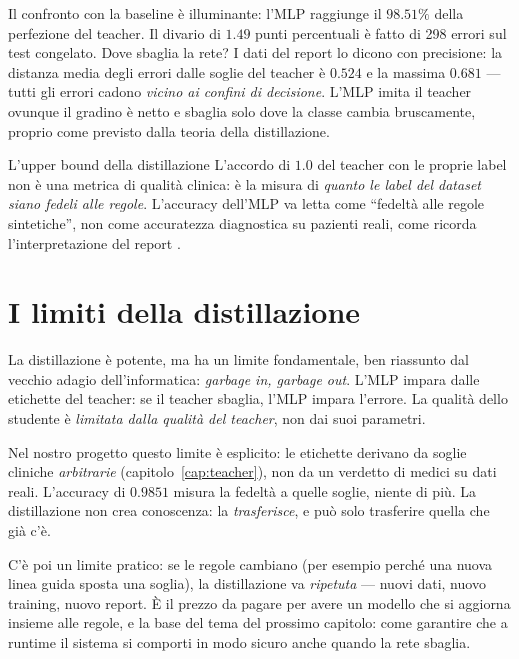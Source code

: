 Il confronto con la baseline è illuminante: l'MLP raggiunge il $98.51\%$
della perfezione del teacher. Il divario di $1.49$ punti percentuali è
fatto di 298 errori sul test congelato. Dove sbaglia la rete? I dati del
report  lo dicono con precisione: la
distanza media degli errori dalle soglie del teacher è $0.524$ e la
massima $0.681$ — tutti gli errori cadono \emph{vicino ai confini di
decisione}. L'MLP imita il teacher ovunque il gradino è netto e sbaglia
solo dove la classe cambia bruscamente, proprio come previsto dalla teoria
della distillazione.

\begin{esempio}{L'upper bound della distillazione}
L'accordo di $1.0$ del teacher con le proprie label non è una metrica di
qualità clinica: è la misura di \emph{quanto le label del dataset siano
fedeli alle regole}. L'accuracy dell'MLP va letta come ``fedeltà alle
regole sintetiche'', non come accuratezza diagnostica su pazienti reali,
come ricorda l'interpretazione del report \cite{progetto2026}.
\end{esempio}

\section{I limiti della distillazione}\label{sec:limiti-distillazione}

La distillazione è potente, ma ha un limite fondamentale, ben riassunto
dal vecchio adagio dell'informatica: \emph{garbage in, garbage out}.
L'MLP impara dalle etichette del teacher: se il teacher sbaglia, l'MLP
impara l'errore. La qualità dello studente è \emph{limitata dalla qualità
del teacher}, non dai suoi parametri.

Nel nostro progetto questo limite è esplicito: le etichette derivano da
soglie cliniche \emph{arbitrarie} (capitolo~\ref{cap:teacher}), non da un
verdetto di medici su dati reali. L'accuracy di $0.9851$ misura la fedeltà
a quelle soglie, niente di più. La distillazione non crea conoscenza: la
\emph{trasferisce}, e può solo trasferire quella che già c'è.

C'è poi un limite pratico: se le regole cambiano (per esempio perché una
nuova linea guida sposta una soglia), la distillazione va \emph{ripetuta}
— nuovi dati, nuovo training, nuovo report. È il prezzo da pagare per
avere un modello che si aggiorna insieme alle regole, e la base del tema
del prossimo capitolo: come garantire che a runtime il sistema si comporti
in modo sicuro anche quando la rete sbaglia.
